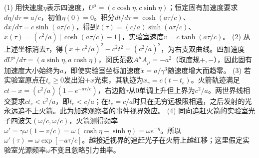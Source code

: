 (1) 用快速度\(\eta\)表示四速度，\(U^\mu=(c\cosh\eta,c\sinh\eta)\)；恒定固有加速度要求\(d\eta/d\tau=a/c\)，初值\(\eta(0)=0\)。积分\(dt/d\tau=\cosh(a\tau/c)\)、\(dx/d\tau=c\sinh(a\tau/c)\)，得到\(t(\tau)=(c/a)\sinh(a\tau/c)\)、\(x(\tau)=(c^2/a)[\cosh(a\tau/c)-1]\)，实验室速度\(v=c\tanh(a\tau/c)\)。
(2) 从上述坐标消去\(\tau\)，得\((x+c^2/a)^2-c^2t^2=(c^2/a)^2\)，为右支双曲线。四加速度\(dU^\mu/d\tau=(a\sinh\eta,a\cosh\eta)\)，闵氏范数\(A^\mu A_\mu=-a^2\)（取度规\(+,-\)），因此固有加速度大小始终为\(a\)，即使实验室坐标加速度\(\ddot x=a/\gamma^3\)随速度增大而趋零。
(3) 若实验室原点在\(t_e\ge0\)发出沿\(+x\)光束，其轨迹为\(x_{\gamma}=c(t-t_e)\)。火箭轨迹满足\(ct-x=(c^2/a)(1-e^{-a\tau/c})\)，右边随\(\tau\)从0单调上升但上界为\(c^2/a\)。两世界线相交要求\(ct_e<c^2/a\)，即\(t_e<c/a\)；在\(t_e=c/a\)时只在无穷远极限相遇，之后发射的光永远追不上火箭。此为加速观察者的事件视界效应。
(4) 同向追赶火箭的实验室光子四波矢\((\omega/c,\omega/c)\)，火箭测得频率\(\omega'=\gamma\omega(1-v/c)=\omega(\cosh\eta-\sinh\eta)=\omega e^{-\eta}\)。所以\(\omega'(\tau)=\omega\exp[-a\tau/c]\)。越接近视界的追赶光子在火箭上越红移；这里假定实验室光源频率\(\omega\)不变且忽略引力曲率。

